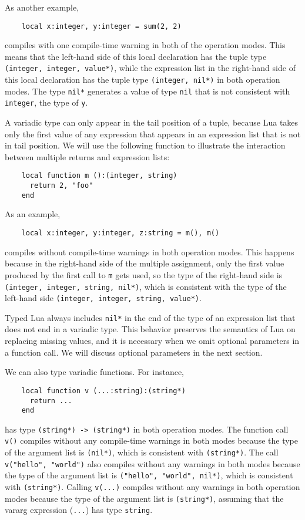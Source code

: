 As another example,
\begin{verbatim}
    local x:integer, y:integer = sum(2, 2)
\end{verbatim}
compiles with one compile-time warning in both of the operation modes.
This means that the left-hand side of this local declaration has
the tuple type \texttt{(integer, integer, value*)}, while the
expression list in the right-hand side of this local declaration
has the tuple type \texttt{(integer, nil*)} in both operation modes.
The type \texttt{nil*} generates a value of type \texttt{nil}
that is not consistent with \texttt{integer}, the type of \texttt{y}.

A variadic type can only appear in the tail position of a tuple,
because Lua takes only the first value of any expression that appears
in an expression list that is not in tail position.
We will use the following function to illustrate the interaction
between multiple returns and expression lists:
\begin{verbatim}
    local function m ():(integer, string)
      return 2, "foo"
    end
\end{verbatim}

As an example,
\begin{verbatim}
    local x:integer, y:integer, z:string = m(), m()
\end{verbatim}
compiles without compile-time warnings in both operation modes.
This happens because in the right-hand side of the multiple
assignment, only the first value produced by the first call
to \texttt{m} gets used, so the type of the right-hand side
is \texttt{(integer, integer, string, nil*)}, which is
consistent with the type of the left-hand side
\texttt{(integer, integer, string, value*)}.

Typed Lua always includes \texttt{nil*} in the end of the type
of an expression list that does not end in a variadic type.
This behavior preserves the semantics of Lua on replacing missing values,
and it is necessary when we omit optional parameters in a function call.
We will discuss optional parameters in the next section.

We can also type variadic functions.
For instance,
\begin{verbatim}
    local function v (...:string):(string*)
      return ...
    end
\end{verbatim}
has type \texttt{(string*) -> (string*)} in both operation modes.
The function call \texttt{v()} compiles without any compile-time warnings in
both modes because the type of the argument list is \texttt{(nil*)},
which is consistent with \texttt{(string*)}.
The call \texttt{v("hello", "world")} also compiles without any warnings
in both modes because the type of the argument list is \texttt{("hello", "world", nil*)},
which is consistent with \texttt{(string*)}.
Calling \texttt{v(...)} compiles without any warnings in both
operation modes because the type of the argument list is \texttt{(string*)},
assuming that the vararg expression (\texttt{...}) has type \texttt{string}.

